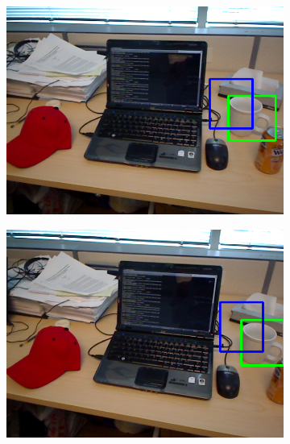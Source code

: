 \begin{figure}
	
	\begin{subfigure}[b]{0.3\textwidth}
		\includegraphics[width=\textwidth]{img/seguimiento_solo_frame/solo_frame-desk_1-coffee_mug_5-frame_29.png}
	\end{subfigure}
	\begin{subfigure}[b]{0.3\textwidth}
		\includegraphics[width=\textwidth]{img/seguimiento_solo_frame/solo_frame-desk_1-coffee_mug_5-frame_30.png}
	\end{subfigure}
	\begin{subfigure}[b]{0.3\textwidth}

\end{subfigure}
\end{figure}
